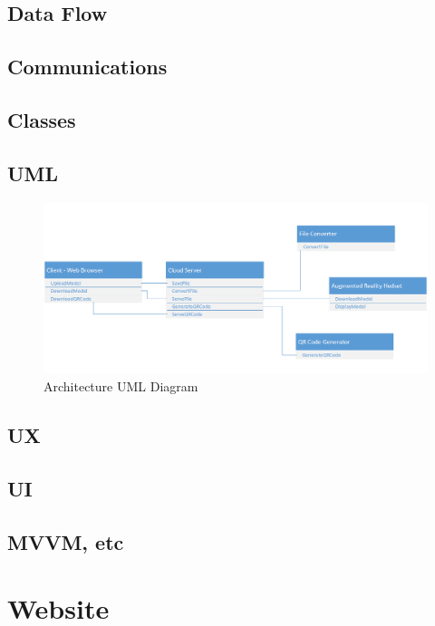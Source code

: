  \subsection{Data Flow}
 
 \subsection{Communications}
 
 \subsection{Classes}
 
 \subsection{UML}
    
   \begin{figure}
   	\centering
   	\includegraphics[width=\textwidth]{UML.png}
   	\caption{Architecture UML Diagram} 	
   \end{figure}
   
 \subsection{UX}
 
 \subsection{UI}
 
 \subsection{MVVM, etc}

 \section{Website}

